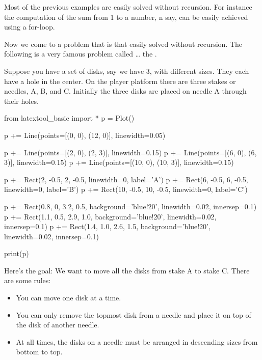 




\newpage{}

Most of the previous examples are easily solved without recursion. For
instance the computation of the sum from 1 to a number, n say, can be
easily achieved using a for-loop.

Now we come to a problem that is  that easily solved
without recursion. The following is a very famous problem called
\ldots{} the .

Suppose you have a set of disks, say we have 3, with different sizes.
They each have a hole in the center. On the player platform there are
three stakes or needles, A, B, and C. Initially the three disks are
placed on needle A through their holes.

\begin{python}
from latextool_basic import *
p = Plot()

p += Line(points=[(0, 0), (12, 0)], linewidth=0.05)

p += Line(points=[(2, 0), (2, 3)], linewidth=0.15)
p += Line(points=[(6, 0), (6, 3)], linewidth=0.15)
p += Line(points=[(10, 0), (10, 3)], linewidth=0.15)

p += Rect(2, -0.5, 2, -0.5, linewidth=0, label='A')
p += Rect(6, -0.5, 6, -0.5, linewidth=0, label='B')
p += Rect(10, -0.5, 10, -0.5, linewidth=0, label='C')

p += Rect(0.8, 0, 3.2, 0.5, background='blue!20', linewidth=0.02, innersep=0.1)  
p += Rect(1.1, 0.5, 2.9, 1.0, background='blue!20', linewidth=0.02, innersep=0.1)
p += Rect(1.4, 1.0, 2.6, 1.5, background='blue!20', linewidth=0.02, innersep=0.1)

print(p)
\end{python}

 Here's the goal: We want to move all the disks from
 stake A to stake C. There are some rules:

 \begin{itemize}
 \item You can move one disk at a time.
 \item You can only remove the topmost disk from a needle and place it on top
   of the disk of another needle.
 \item At all times, the disks on a needle must be arranged in descending
   sizes from bottom to top.
 \end{itemize}

